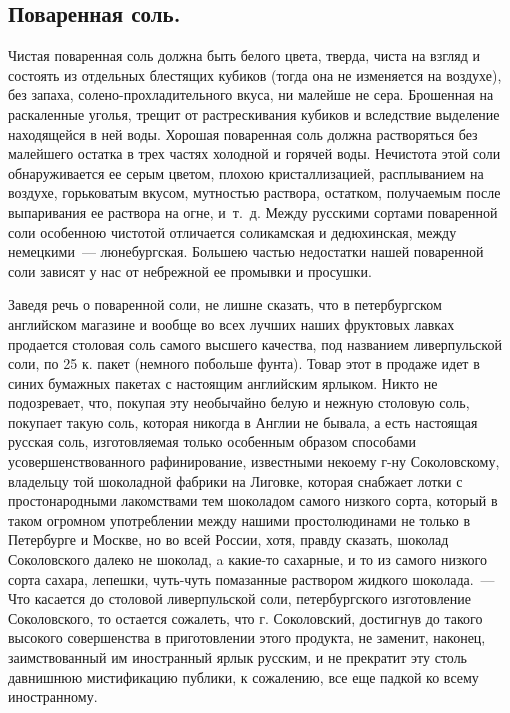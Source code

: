 \subsection{Поваренная соль.}
Чистая поваренная соль должна быть белого цвета, тверда, чиста на взгляд и состоять из отдельных блестящих кубиков (тогда она не изменяется на воздухе), без запаха, солено-прохладительного вкуса, ни малейше не сера. Брошенная на раскаленные уголья, трещит от растрескивания кубиков и вследствие выделение находящейся в ней воды. Хорошая поваренная соль должна растворяться без малейшего остатка в трех частях холодной и горячей воды. Нечистота этой соли обнаруживается ее серым цветом, плохою кристаллизацией, расплыванием на воздухе, горьковатым вкусом, мутностью раствора, остатком, получаемым после выпаривания ее раствора на огне, и~т.~д. Между русскими сортами поваренной соли особенною чистотой отличается соликамская и дедюхинская, между немецкими~--- люнебургская. Большею частью недостатки нашей поваренной соли зависят у нас от небрежной ее промывки и просушки.

Заведя речь о поваренной соли, не лишне сказать, что в петербургском английском магазине и вообще во всех лучших наших фруктовых лавках продается столовая соль самого высшего качества, под названием ливерпульской соли, по 25 к. пакет (немного побольше фунта). Товар этот в продаже идет в синих бумажных пакетах с настоящим английским ярлыком. Никто не подозревает, что, покупая эту необычайно белую и нежную столовую соль, покупает такую соль, которая никогда в Англии не бывала, а есть настоящая русская соль, изготовляемая только особенным образом способами усовершенствованного рафинирование, известными некоему г-ну Соколовскому, владельцу той шоколадной фабрики на Лиговке, которая снабжает лотки с простонародными лакомствами тем шоколадом самого низкого сорта, который в таком огромном употреблении между нашими простолюдинами не только в Петербурге и Москве, но во всей России, хотя, правду сказать, шоколад Соколовского далеко не шоколад, a какие-то сахарные, и то из самого низкого сорта сахара, лепешки, чуть-чуть помазанные раствором жидкого шоколада.~--- Что касается до столовой ливерпульской соли, петербургского изготовление Соколовского, то остается сожалеть, что г. Соколовский, достигнув до такого высокого совершенства в приготовлении этого продукта, не заменит, наконец, заимствованный им иностранный ярлык русским, и не прекратит эту столь давнишнюю мистификацию публики, к сожалению, все еще падкой ко всему иностранному.

